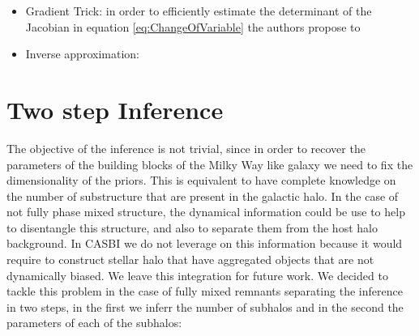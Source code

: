 \begin{itemize}
\item Gradient Trick: in order to efficiently estimate the determinant of the Jacobian in equation \ref{eq:ChangeOfVariable} the authors propose to 

\item Inverse approximation:
\end{itemize}


\section{Two step Inference}\label{sec:Two step Inference}
The objective of the inference is not trivial, since in order to recover the parameters of the building blocks of the Milky Way like galaxy we need to fix the dimensionality of the priors. This is equivalent to have complete knowledge on the number of substructure that are present in the galactic halo. In the case of not fully phase mixed structure, the dynamical information could be use to help to disentangle this structure, and also to separate them from the host halo background. In CASBI we do not leverage on this information because it would require to construct stellar halo that have aggregated objects that are not dynamically biased. We leave this integration for future work. We decided to tackle this problem in the case of fully mixed remnants separating the inference in two steps, in the first we inferr the number of subhalos and in the second the parameters of each of the subhalos:

